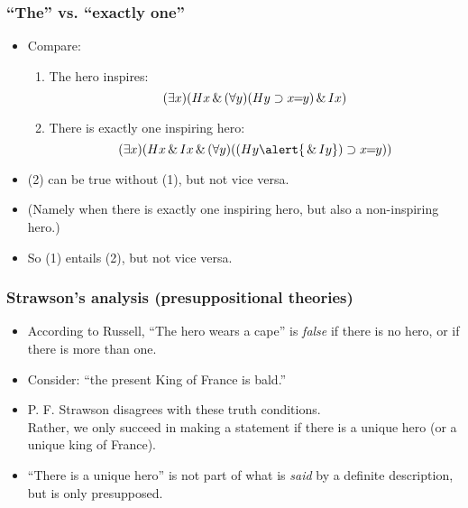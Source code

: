 \begin{frame}
\frametitle{``The'' vs. ``exactly one''}

\begin{itemize}[<+->]
\item Compare:
\begin{enumerate}[<+->]
\item The hero inspires:
\[(\exists x)(Hx \,\&\, (\forall y)(Hy \supset x\!\!=\!\!y) \,\&\, Ix)\]
\item There is exactly one inspiring hero:
\[\qt{\exists}{x}(H\qv{x} \land I\qv{x} \land \qt{\forall}{y}((H\qv{y} \alert{{}\land I\qv{y}}) \to x\!\!=\!\!y) )\]
\end{enumerate}
\item (2) can be true without (1), but not vice versa.
\item (Namely when there is exactly one inspiring hero, but also a non-inspiring hero.)
\item So (1) entails (2), but not vice versa.
\end{itemize}
\end{frame}

\begin{frame}
    \frametitle{Strawson's analysis (presuppositional theories)}

\begin{itemize}[<+->]
\item According to Russell, ``The hero wears a cape'' is \emph{false} if there is no hero, or if there is more than one.
\item Consider: ``the present King of France is bald.''
\item P. F. Strawson disagrees with these truth conditions. \\ Rather, we only succeed in making a statement \textcolor{OGlyallpink}{if there is a unique hero} (or a unique king of France).
\item ``There is a unique hero'' is not part of what is \emph{said} by a definite description, but is only \textcolor{OGlyallpink}{presupposed}.
\end{itemize}
\end{frame}

